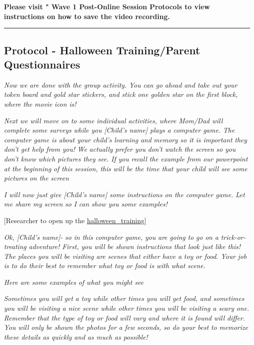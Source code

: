 \documentclass[]{book}
\begin{document}
\textbf{Please visit " Wave 1 Post-Online Session Protocols to view instructions on how to save the video recording.}

\begin{center}\rule{0.5\linewidth}{0.5pt}\end{center}

\hypertarget{protocol---halloween-trainingparent-questionnaires-1}{%
\subsection{Protocol - Halloween Training/Parent Questionnaires}\label{protocol---halloween-trainingparent-questionnaires-1}}

\emph{Now we are done with the group activity. You can go ahead and take out your token board and gold star stickers, and stick one golden star on the first block, where the movie icon is!}

\emph{Next we will move on to some individual activities, where Mom/Dad will complete some surveys while you {[}Child's name{]} plays a computer game. The computer game is about your child's learning and memory so it is important they don't get help from you! We actually prefer you don't watch the screen so you don't know which pictures they see. If you recall the example from our powerpoint at the beginning of this session, this will be the time that your child will see some pictures on the screen}

\emph{I will now just give {[}Child's name{]} some instructions on the computer game. Let me share my screen so I can show you some examples!}

{[}Researcher to open up the \href{https://ucla.app.box.com/file/709481066655}{halloween\_training}{]}

\emph{Ok, {[}Child's name{]}- so in this computer game, you are going to go on a trick-or-treating adventure! First, you will be shown instructions that look just like this! The places you will be visiting are scenes that either have a toy or food. Your job is to do their best to remember what toy or food is with what scene.}

\emph{Here are some examples of what you might see}

\emph{Sometimes you will get a toy while other times you will get food, and sometimes you will be visiting a nice scene while other times you will be visiting a scary one. Remember that the type of toy or food will vary and where it is found will differ. You will only be shown the photos for a few seconds, so do your best to memorize these details as quickly and as much as possible!}
\end{document}
